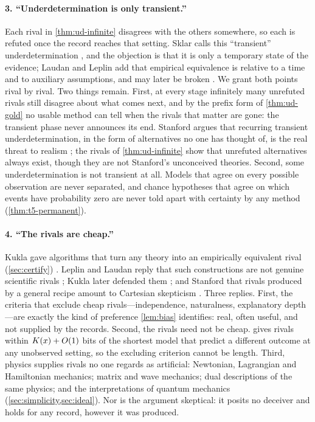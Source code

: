 \paragraph{3. ``Underdetermination is only transient.''}
Each rival in \cref{thm:ud-infinite} disagrees with the others somewhere, so each is
refuted once the record reaches that setting. Sklar calls this ``transient''
underdetermination \citep[p.~380]{sklar1975}, and the objection is that it is only a temporary
state of the evidence;
Laudan and Leplin add that empirical equivalence is relative to a time and to
auxiliary assumptions, and may later be broken \citep{laudan-leplin1991}. We grant
both points rival by rival. Two things remain. First, at every stage infinitely
many unrefuted rivals still disagree about what comes next, and by the prefix form
of \cref{thm:ud-gold} no usable method can tell when the rivals that matter are
gone: the transient phase never announces its end. Stanford argues that recurring
transient underdetermination, in the form of alternatives no one has thought of, is
the real threat to realism \citep{stanford2006}; the rivals of \cref{thm:ud-infinite} show that unrefuted alternatives always exist, though they
are not Stanford's unconceived theories. Second, some underdetermination is not transient at all. Models that
agree on every possible observation are never separated, and chance hypotheses that
agree on which events have probability zero are never told apart with certainty by
any method (\cref{thm:t5-permanent}).

\paragraph{4. ``The rivals are cheap.''}
Kukla gave algorithms that turn any theory into an empirically equivalent rival
(\cref{sec:certify}) \citep{kukla1993}. Leplin
and Laudan reply that such constructions are not genuine scientific rivals
\citep{leplin-laudan1993}; Kukla later defended them \citep{kukla1996}; and Stanford that rivals produced by a general recipe
amount to Cartesian skepticism \citep{stanford2001}. Three replies. First, the
criteria that exclude cheap rivals---independence, naturalness, explanatory
depth---are exactly the kind of preference \cref{lem:bias} identifies: real, often
useful, and not supplied by the records. Second, the rivals need not be cheap.
 gives rivals within $K(x)+O(1)$ bits of the shortest model that
predict a different outcome at any unobserved setting, so the excluding criterion
cannot be length. Third, physics supplies rivals no one regards as artificial:
Newtonian, Lagrangian and Hamiltonian mechanics; matrix and wave mechanics; dual
descriptions of the same physics; and the interpretations of quantum mechanics
(\cref{sec:simplicity,sec:ideal}). Nor is the argument skeptical: it posits no
deceiver and holds for any record, however it was produced.

